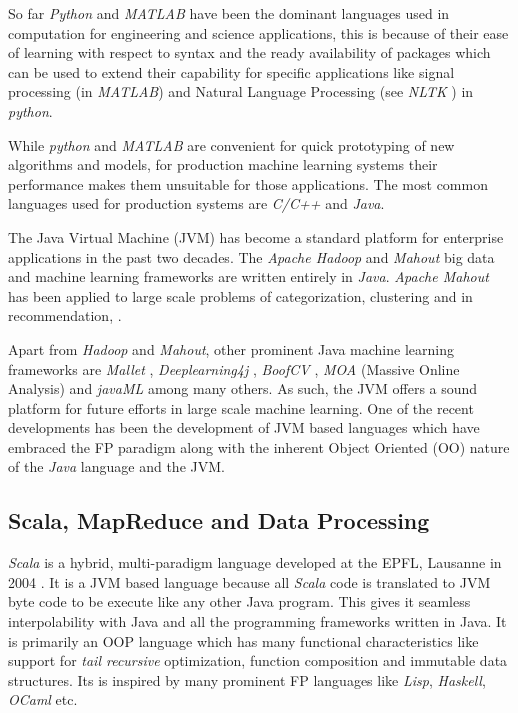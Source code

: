 So far \textit{Python} and \textit{MATLAB} have been the dominant languages used in computation for engineering and science applications, this is because of their ease of learning with respect to syntax and the ready availability of packages which can be used to extend their capability for specific applications like signal processing (in \textit{MATLAB}) and Natural Language Processing (see \textit{NLTK} \cite{NLTK} ) in \textit{python}.

While \textit{python} and \textit{MATLAB} are convenient for quick prototyping of new algorithms and models, for production machine learning systems their performance makes them unsuitable for those applications. The most common languages used for production systems are \textit{C/C++} and \textit{Java}. 

The Java Virtual Machine (JVM) has become a standard platform for enterprise applications in the past two decades. The \textit{Apache Hadoop} \cite{Hadoop:2005} and \textit{Mahout} \cite{Mahout} big data and machine learning frameworks are written entirely in \textit{Java}. \emph{Apache Mahout} has been applied to large scale problems  \cite{mahoutinaction} of categorization, clustering \cite{mahoutclus} and in recommendation, \cite{mahoutreco1}. 

Apart from \emph{Hadoop} and \emph{Mahout}, other prominent Java machine learning frameworks are \emph{Mallet} \cite{Mallet}, \emph{Deeplearning4j} \cite{dl4j}, \emph{BoofCV} \cite{BoofCV2012}, \emph{MOA} (Massive Online Analysis) \cite{MOA} and \emph{javaML} \cite{javaML} among many others.  As such, the JVM offers a sound platform for future efforts in large scale machine learning. One of the recent developments has been the development of JVM based languages which have embraced the FP paradigm along with the inherent Object Oriented (OO) nature of the \textit{Java} language and the JVM.

\subsection*{Scala, MapReduce and Data Processing}

\textit{Scala} is a hybrid, multi-paradigm language developed at the EPFL, Lausanne in 2004 \cite{scala-overview-tech-report}. It is a JVM based language because all \textit{Scala} code is translated to JVM byte code to be execute like any other Java program. This gives it seamless interpolability with Java and all the programming frameworks written in Java. It is primarily an OOP language which has many functional characteristics like support for \textit{tail recursive} optimization, function composition and immutable data structures. Its is inspired by many prominent FP languages like \textit{Lisp}, \textit{Haskell}, \textit{OCaml} etc.

